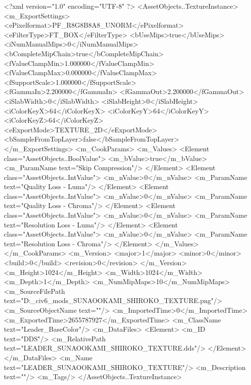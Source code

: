 <?xml version="1.0" encoding="UTF-8" ?>
<AssetObjects..TextureInstance>
	<m_ExportSettings>
		<ePixelformat>PF_R8G8B8A8_UNORM</ePixelformat>
		<eFilterType>FT_BOX</eFilterType>
		<bUseMips>true</bUseMips>
		<iNumManualMips>0</iNumManualMips>
		<bCompleteMipChain>true</bCompleteMipChain>
		<fValueClampMin>1.000000</fValueClampMin>
		<fValueClampMax>0.000000</fValueClampMax>
		<fSupportScale>1.000000</fSupportScale>
		<fGammaIn>2.200000</fGammaIn>
		<fGammaOut>2.200000</fGammaOut>
		<iSlabWidth>0</iSlabWidth>
		<iSlabHeight>0</iSlabHeight>
		<iColorKeyX>64</iColorKeyX>
		<iColorKeyY>64</iColorKeyY>
		<iColorKeyZ>64</iColorKeyZ>
		<eExportMode>TEXTURE_2D</eExportMode>
		<bSampleFromTopLayer>false</bSampleFromTopLayer>
	</m_ExportSettings>
	<m_CookParams>
		<m_Values>
			<Element class="AssetObjects..BoolValue">
				<m_bValue>true</m_bValue>
				<m_ParamName text="Skip Compression"/>
			</Element>
			<Element class="AssetObjects..IntValue">
				<m_nValue>0</m_nValue>
				<m_ParamName text="Quality Loss - Luma"/>
			</Element>
			<Element class="AssetObjects..IntValue">
				<m_nValue>0</m_nValue>
				<m_ParamName text="Quality Loss - Chroma"/>
			</Element>
			<Element class="AssetObjects..IntValue">
				<m_nValue>0</m_nValue>
				<m_ParamName text="Resolution Loss - Luma"/>
			</Element>
			<Element class="AssetObjects..IntValue">
				<m_nValue>0</m_nValue>
				<m_ParamName text="Resolution Loss - Chroma"/>
			</Element>
		</m_Values>
	</m_CookParams>
	<m_Version>
		<major>1</major>
		<minor>0</minor>
		<build>0</build>
		<revision>0</revision>
	</m_Version>
	<m_Height>1024</m_Height>
	<m_Width>1024</m_Width>
	<m_Depth>1</m_Depth>
	<m_NumMipMaps>10</m_NumMipMaps>
	<m_SourceFilePath text="D:\Documents\GitHub\Uzuki_civ6_mods\BankHeisters\LEADER_SUNAOOKAMI_SHIROKO_TEXTURE.png"/>
	<m_SourceObjectName text=""/>
	<m_ImportedTime>0</m_ImportedTime>
	<m_ExportedTime>2655787927</m_ExportedTime>
	<m_ClassName text="Leader_BaseColor"/>
	<m_DataFiles>
		<Element>
			<m_ID text="DDS"/>
			<m_RelativePath text="LEADER_SUNAOOKAMI_SHIROKO_TEXTURE.dds"/>
		</Element>
	</m_DataFiles>
	<m_Name text="LEADER_SUNAOOKAMI_SHIROKO_TEXTURE"/>
	<m_Description text=""/>
	<m_Tags/>
</AssetObjects..TextureInstance>

